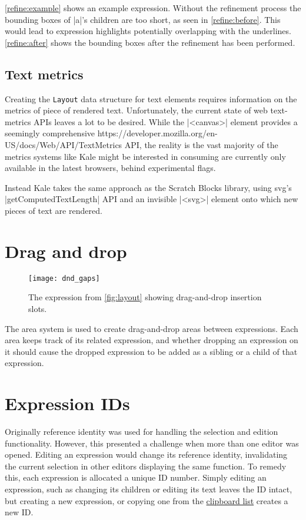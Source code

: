 \autoref{refine:example} shows an example expression. Without the
refinement process the bounding boxes of |a|'s children are too short, as seen
in \autoref{refine:before}. This would lead to expression highlights potentially
overlapping with the underlines. \autoref{refine:after} shows the bounding boxes
after the refinement has been performed. 

\subsection{Text metrics}

Creating the \texttt{Layout} data structure for text elements requires
information on the metrics of piece of rendered text. Unfortunately, the current
state of web text-metrics APIs leaves a lot to be desired. While
the |<canvas>| element provides a seemingly comprehensive
{https://developer.mozilla.org/en-US/docs/Web/API/TextMetrics} API,
the reality is the vast majority of the metrics systems like Kale might
be interested in consuming are currently only available in the latest
browsers, behind experimental flags.


Instead Kale takes the same approach as the Scratch Blocks \cite{ScratchBlocks}
library, using \ac{svg}'s |getComputedTextLength| API and an invisible
|<svg>| element onto which new pieces of text are rendered. 


\needspace{7cm}
\section{Drag and drop}
\label{impl:dnd}
\begin{wrapfigure}[10]{r}{0pt}
\texttt{[image: dnd\_gaps]}
\caption{The expression from \autoref{fig:layout} showing drag-and-drop
insertion slots.}
\end{wrapfigure}
The area system is used to create drag-and-drop areas between expressions.
Each area keeps track of its related expression, and whether dropping an
expression on it should cause the dropped expression to be added as a
sibling or a child of that expression.


\section{Expression IDs}
Originally reference identity was used for handling the selection and edition
functionality. However, this presented a challenge when more than one editor
was opened. Editing an expression would change its reference identity,
invalidating the current selection in other editors displaying the same
function. To remedy this, each expression is allocated a unique ID number.
Simply editing an expression, such as changing its children or editing its text
leaves the ID intact, but creating a new expression, or copying one from the
\hyperref[soln:clipboard_list]{clipboard list} creates a new ID.




